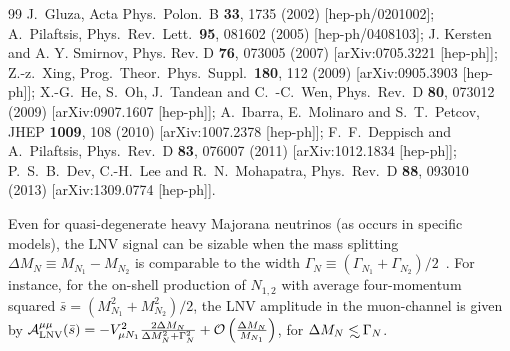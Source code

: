 \documentclass[reprint,prl,twocolumn,superscriptaddress,showpacs,nofootinbib,floatfix,preprintnumbers]{revtex4-1}
\def\lsim{\mathrel{\rlap{\lower4pt\hbox{\hskip1pt$\sim$}}
    \raise1pt\hbox{$<$}}}  %
\begin{document}
\begin{thebibliography}{99}
J.~Gluza,
  Acta Phys.\ Polon.\ B {\bf 33}, 1735 (2002) [hep-ph/0201002]; 
A.~Pilaftsis,
  Phys.\ Rev.\ Lett.\  {\bf 95}, 081602 (2005) [hep-ph/0408103]; 
J. Kersten and A. Y. Smirnov, Phys. Rev. D {\bf 76}, 073005 (2007) [arXiv:0705.3221 [hep-ph]];   
Z.-z.~Xing,
  Prog.\ Theor.\ Phys.\ Suppl.\  {\bf 180}, 112 (2009) [arXiv:0905.3903 [hep-ph]];   
X.-G.~He, S.~Oh, J.~Tandean and C.~-C.~Wen,
  Phys.\ Rev.\ D {\bf 80}, 073012 (2009) [arXiv:0907.1607 [hep-ph]]; 
A.~Ibarra, E.~Molinaro and S.~T.~Petcov,
  JHEP {\bf 1009}, 108 (2010) [arXiv:1007.2378 [hep-ph]];
F.~F.~Deppisch and A.~Pilaftsis,
  Phys.\ Rev.\ D {\bf 83}, 076007 (2011) [arXiv:1012.1834 [hep-ph]]; 
 P.~S.~B.~Dev, C.-H.~Lee and R.~N.~Mohapatra,
  Phys.\ Rev.\ D {\bf 88}, 093010 (2013) [arXiv:1309.0774 [hep-ph]].

 Even for quasi-degenerate heavy Majorana neutrinos (as occurs in specific models), the LNV signal can be sizable when the mass splitting $\Delta M_N\equiv M_{N_1}-M_{N_2}$ is comparable to the width $\Gamma_N\equiv (\Gamma_{N_1}+\Gamma_{N_2})/2$~\cite{BLP}. For instance, for the on-shell production of $N_{1,2}$ with average four-momentum squared $\bar{s}=(M_{N_1}^2+M_{N_2}^2)/2$, the LNV amplitude in the muon-channel is given by ${\cal A}_{\rm LNV}^{\mu\mu}(\bar{s})=-V^2_{\mu N_1}\frac{2\Delta M_N}{\Delta M_N^2+\Gamma_N^2}+{\cal O}\left(\frac{\Delta M_N}{M_{N_1}}\right)$, for $\Delta M_N\lsim \Gamma_N$.   


\end{thebibliography}
\end{document}
